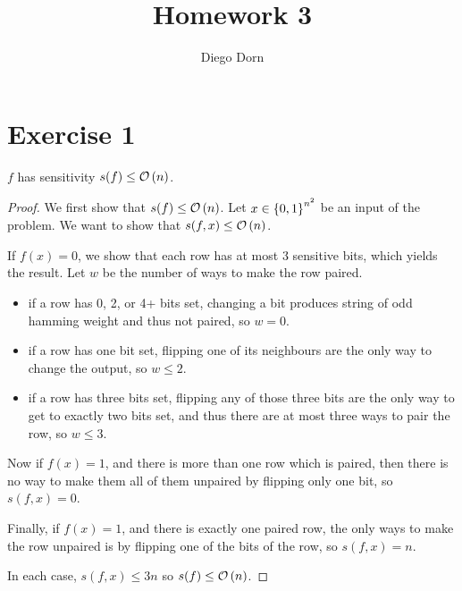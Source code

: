 

\title{Homework 3}
\author{Diego Dorn}

\newcommand{\Eq}{\textsc{Eq}\xspace}
\newcommand{\Iso}{\textsc{Iso}\xspace}
\newcommand{\REF}{\textsc{Ref}\xspace}
\newcommand{\SI}{\textsc{SI}\xspace}
\newcommand{\Rcc}[1]{\mathrm{R}^{cc}_{1/3}\parenthesis{#1}}
\newcommand{\Dcc}[1]{\mathrm{D}^{cc}\parenthesis{#1}}



    \maketitle

    \section*{Exercise 1}

    \begin{claim}
        $f$ has sensitivity $s(f) \leq \mathcal{O}\left(n\right)$.
    \end{claim}
    \begin{proof}
        We first show that $s(f) \leq \mathcal{O}\left(n\right)$.
        Let $x \in \left\{ 0, 1 \right\}^{n^2}$ be an input of the problem.
        We want to show that $s(f, x) \leq \mathcal{O}\left(n\right)$. 

        If $f(x) = 0$,
        we show that each row has at most 3 sensitive bits, which yields the result.
        Let $w$ be the number of ways to make the row paired.
        \begin{itemize}
            \item if a row has 0, 2, or 4+ bits set, changing a bit produces 
                string of odd hamming weight and thus not paired, so $w = 0$.
            \item if a row has one bit set, flipping one of its neighbours
                are the only way to change the output, so $w \leq 2$.
            \item if a row has three bits set, flipping any of those three bits
                are the only way to get to exactly two bits set, and thus there are
                at most three ways to pair the row, so $w \leq 3$.
        \end{itemize}

        Now if $f(x) = 1$, and there is more than one row which is paired,
        then there is no way to make them all of them unpaired by flipping only one 
        bit, so $s(f, x) = 0$.

        Finally, if $f(x) = 1$, and there is exactly one paired row, the only
        ways to make the row unpaired is by flipping one of the bits of the row,
        so $s(f, x) = n$.
        
        In each case, $s(f, x) \leq 3n$ so $s(f) \leq \mathcal{O}\left(n\right)$.
    \end{proof}

